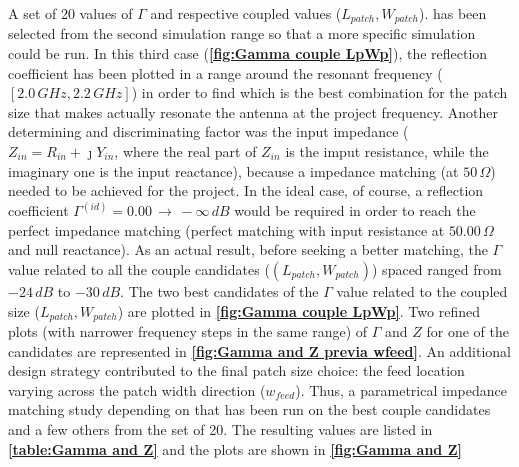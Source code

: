 \documentclass[10pt,a4paper,twocolumn]{article}
\begin{document}
{%
A set of 20 values of $\Gamma$ and respective coupled values ($L_{patch},W_{patch}$). has been selected from the second simulation range so that a more specific simulation could be run. In this third case (\textbf{\cref{fig:Gamma couple LpWp}}), the reflection coefficient has been plotted in a range around the resonant frequency ($[2.0\,GHz, 2.2\,GHz]$) in order to find which is the best combination for the patch size that makes actually resonate the antenna at the project frequency. Another determining and discriminating factor was the input impedance ($Z_{in}=R_{in}+\jmath Y_{in}$, where the real part of $Z_{in}$ is the imput resistance, while the imaginary one is the input reactance), because a impedance matching (at $50\,\Omega$) needed to be achieved for the project. In the ideal case, of course, a reflection coefficient $\Gamma^{(id)}=0.00\,\to\,-\infty\,dB$ would be required in order to reach the perfect impedance matching (perfect matching with input resistance at $50.00\,\Omega$ and null reactance). As an actual result, before seeking a better matching, the $\Gamma$ value related to all the couple candidates ($(L_{patch},W_{patch})$) spaced ranged from $-24\,dB$ to $-30\,dB$. The two best candidates of the $\Gamma$ value related to the coupled size ($L_{patch},W_{patch}$) are plotted in \textbf{\cref{fig:Gamma couple LpWp}}. Two refined plots (with narrower frequency steps in the same range) of $\Gamma$ and $Z$ for one of the candidates are represented in \textbf{\cref{fig:Gamma and Z previa wfeed}}. An additional design strategy contributed to the final patch size choice: the feed location varying across the patch width direction ($w_{feed}$). Thus, a parametrical impedance matching study depending on that has been run on the best couple candidates and a few others from the set of 20. The resulting values are listed in \textbf{\cref{table:Gamma and Z}} and the plots are shown in \textbf{\cref{fig:Gamma and Z}}


}
\end{document}
